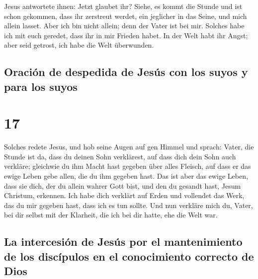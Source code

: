  Jesus antwortete ihnen: Jetzt glaubet ihr?
 Siehe, es kommt die Stunde und ist schon gekommen, dass
ihr zerstreut werdet, ein jeglicher in das Seine, und mich allein
lasset. Aber ich bin nicht allein; denn der Vater ist bei mir.
 Solches habe ich mit euch geredet, dass ihr in mir
Frieden habet. In der Welt habt ihr Angst; aber seid getrost, ich habe
die Welt überwunden.

\hypertarget{oraciuxf3n-de-despedida-de-jesuxfas-con-los-suyos-y-para-los-suyos}{%
\subsection{Oración de despedida de Jesús con los suyos y para los
suyos}\label{oraciuxf3n-de-despedida-de-jesuxfas-con-los-suyos-y-para-los-suyos}}

\hypertarget{section-16}{%
\section{17}\label{section-16}}

 Solches redete Jesus, und hob seine Augen auf gen Himmel
und sprach: Vater, die Stunde ist da, dass du deinen Sohn verklärest,
auf dass dich dein Sohn auch verkläre;  gleichwie du ihm
Macht hast gegeben über alles Fleisch, auf dass er das ewige Leben gebe
allen, die du ihm gegeben hast.  Das ist aber das ewige
Leben, dass sie dich, der du allein wahrer Gott bist, und den du gesandt
hast, Jesum Christum, erkennen.  Ich habe dich verklärt
auf Erden und vollendet das Werk, das du mir gegeben hast, dass ich es
tun sollte.  Und nun verkläre mich du, Vater, bei dir
selbst mit der Klarheit, die ich bei dir hatte, ehe die Welt war.

\hypertarget{la-intercesiuxf3n-de-jesuxfas-por-el-mantenimiento-de-los-discuxedpulos-en-el-conocimiento-correcto-de-dios}{%
\subsection{La intercesión de Jesús por el mantenimiento de los
discípulos en el conocimiento correcto de
Dios}\label{la-intercesiuxf3n-de-jesuxfas-por-el-mantenimiento-de-los-discuxedpulos-en-el-conocimiento-correcto-de-dios}}

